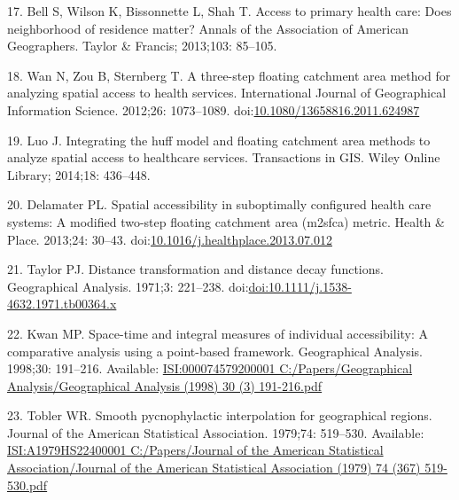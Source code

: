\documentclass[10pt,letterpaper]{article}
\begin{document}
\hypertarget{ref-Bell2013}{}
17. Bell S, Wilson K, Bissonnette L, Shah T. Access to primary health
care: Does neighborhood of residence matter? Annals of the Association
of American Geographers. Taylor \& Francis; 2013;103: 85--105.

\hypertarget{ref-Wan2012}{}
18. Wan N, Zou B, Sternberg T. A three-step floating catchment area
method for analyzing spatial access to health services. International
Journal of Geographical Information Science. 2012;26: 1073--1089.
doi:\href{https://doi.org/10.1080/13658816.2011.624987}{10.1080/13658816.2011.624987}

\hypertarget{ref-Luo2014}{}
19. Luo J. Integrating the huff model and floating catchment area
methods to analyze spatial access to healthcare services. Transactions
in GIS. Wiley Online Library; 2014;18: 436--448.

\hypertarget{ref-Delamater2013}{}
20. Delamater PL. Spatial accessibility in suboptimally configured
health care systems: A modified two-step floating catchment area
(m2sfca) metric. Health \& Place. 2013;24: 30--43.
doi:\href{https://doi.org/10.1016/j.healthplace.2013.07.012}{10.1016/j.healthplace.2013.07.012}

\hypertarget{ref-Taylor1971}{}
21. Taylor PJ. Distance transformation and distance decay functions.
Geographical Analysis. 1971;3: 221--238.
doi:\href{https://doi.org/doi:10.1111/j.1538-4632.1971.tb00364.x}{doi:10.1111/j.1538-4632.1971.tb00364.x}

\hypertarget{ref-Kwan1998}{}
22. Kwan MP. Space-time and integral measures of individual
accessibility: A comparative analysis using a point-based framework.
Geographical Analysis. 1998;30: 191--216. Available:
\href{ISI:000074579200001\%0AC:/Papers/Geographical\%20Analysis/Geographical\%20Analysis\%20(1998)\%2030\%20(3)\%20191-216.pdf}{ISI:000074579200001
C:/Papers/Geographical Analysis/Geographical Analysis (1998) 30 (3) 191-216.pdf}

\hypertarget{ref-Tobler1979}{}
23. Tobler WR. Smooth pycnophylactic interpolation for geographical
regions. Journal of the American Statistical Association. 1979;74:
519--530. Available:
\href{ISI:A1979HS22400001\%0AC:/Papers/Journal\%20of\%20the\%20American\%20Statistical\%20Association/Journal\%20of\%20the\%20American\%20Statistical\%20Association\%20(1979)\%2074\%20(367)\%20519-530.pdf}{ISI:A1979HS22400001
C:/Papers/Journal of the American Statistical Association/Journal of the American Statistical Association (1979) 74 (367) 519-530.pdf}
\end{document}
